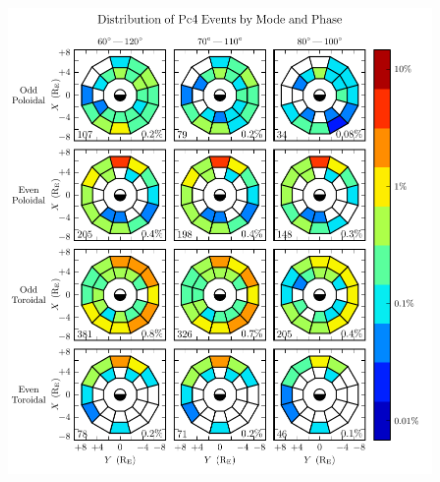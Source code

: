\begin{figure}[!htb]
    \centering
    \includegraphics[width=\textwidth]{figures/mode_phase.pdf}
    \caption[Observation Rate of Pc4 Events by Mode and Phase]{
      \todo{$\cdots$}
    }
    \label{fig_mode_phase}
\end{figure}








